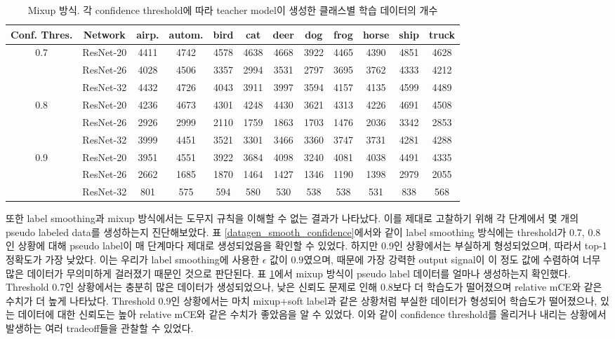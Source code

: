\documentclass[a4paper, 10pt]{article}
\begin{document}
\begin{table}[!h]
  \center
  \begin{tabular}{|c|c|cccccccccc|}
\hline
Conf. Thres. & Network & airp. & autom. & bird & cat & deer & dog & frog & horse & ship & truck \\ \hline
0.7 & ResNet-20 & 4411 & 4742 & 4578 & 4638 & 4668 & 3922 & 4465 & 4390 & 4851 & 4628 \\
    & ResNet-26 & 4028 & 4506 & 3357 & 2994 & 3531 & 2797 & 3695 & 3762 & 4333 & 4212 \\
    & ResNet-32 & 4432 & 4726 & 4043 & 3911 & 3997 & 3594 & 4157 & 4135 & 4599 & 4489 \\ \hline

0.8 & ResNet-20 & 4236 & 4673 & 4301 & 4248 & 4430 & 3621 & 4313 & 4226 & 4691 & 4508 \\ 
    & ResNet-26 & 2926 & 2999 & 2110 & 1759 & 1863 & 1703 & 1476 & 2036 & 3342 & 2853 \\
    & ResNet-32 & 3999 & 4451 & 3521 & 3301 & 3466 & 3360 & 3747 & 3731 & 4281 & 4288 \\ \hline

0.9 & ResNet-20 & 3951 & 4551 & 3922 & 3684 & 4098 & 3240 & 4081 & 4038 & 4491 & 4335 \\ 
    & ResNet-26 & 2662 & 1685 & 1870 & 1464 & 1427 & 1346 & 1190 & 1398 & 2979 & 2055 \\
    & ResNet-32 & 801 & 575 & 594 & 580 & 530 & 538 & 538 & 531 & 838 & 568 \\ \hline 
  \end{tabular}
  \caption{Mixup 방식. 각 confidence threshold에 따라 teacher model이 생성한 클래스별 학습 데이터의 개수}
  \label{datagen_mixup_confidence}
\end{table}
또한 label smoothing과 mixup 방식에서는 도무지 규칙을 이해할 수 없는 결과가
나타났다. 이를 제대로 고찰하기 위해 각 단계에서 몇 개의 pseudo labeled data를
생성하는지 진단해보았다. 표 \ref{datagen_smooth_confidence}에서와 같이 label
smoothing 방식에는 threshold가 0.7, 0.8인 상황에 대해 pseudo label이 매 단계마다
제대로 생성되었음을 확인할 수 있었다. 하지만 0.9인 상황에서는 부실하게
형성되었으며, 따라서 top-1 정확도가 가장 낮았다. 이는 우리가 label smoothing에
사용한 $\epsilon$ 값이 $0.9$였으며, 때문에 가장 강력한 output signal이 이 정도
값에 수렴하여 너무 많은 데이터가 무의미하게 걸러졌기 때문인 것으로 판단된다. 표
\ref{datagen_mixup_confidence}에서 mixup 방식이 pseudo label 데이터를 얼마나
생성하는지 확인했다. Threshold 0.7인 상황에서는 충분히 많은 데이터가
생성되었으나, 낮은 신뢰도 문제로 인해 0.8보다 더 학습도가 떨어졌으며 relative
mCE와 같은 수치가 더 높게 나타났다. Threshold 0.9인 상황에서는 마치 mixup+soft
label과 같은 상황처럼 부실한 데이터가 형성되어 학습도가 떨어졌으나, 있는
데이터에 대한 신뢰도는 높아 relative mCE와 같은 수치가 좋았음을 알 수 있었다.
이와 같이 confidence threshold를 올리거나 내리는 상황에서 발생하는 여러
tradeoff들을 관찰할 수 있었다.
\end{document}
